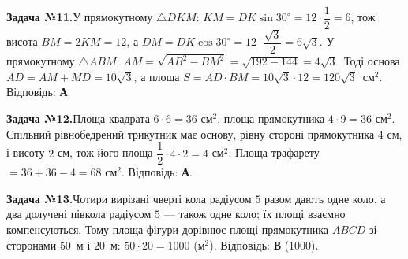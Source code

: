 \documentclass[12pt]{article}
\begin{document}
\par\vspace{0.3cm}\noindent\hypertarget{sol:11}{}
\begin{tcolorbox}[colback=titleBg!40, colframe=mainGreen!55, boxrule=0.4pt, arc=2pt, left=6pt, right=6pt, top=4pt, bottom=4pt, breakable]
\noindent\small\textbf{Задача №11.}\quad У прямокутному $\triangle DKM$: $KM=DK\sin30^\circ=12\cdot\dfrac{1}{2}=6$, тож висота $BM=2KM=12$, а $DM=DK\cos30^\circ=12\cdot\dfrac{\sqrt3}{2}=6\sqrt3$. У прямокутному $\triangle ABM$: $AM=\sqrt{AB^2-BM^2}=\sqrt{192-144}=4\sqrt3$. Тоді основа $AD=AM+MD=10\sqrt3$, а площа $S=AD\cdot BM=10\sqrt3\cdot12=120\sqrt3$~см$^2$. Відповідь: \textbf{А}.
\par\vspace{0.1cm}\hfill\hyperlink{task:11}{}
\end{tcolorbox}
\par\vspace{0.3cm}\noindent\hypertarget{sol:12}{}
\begin{tcolorbox}[colback=titleBg!40, colframe=mainGreen!55, boxrule=0.4pt, arc=2pt, left=6pt, right=6pt, top=4pt, bottom=4pt, breakable]
\noindent\small\textbf{Задача №12.}\quad Площа квадрата $6\cdot 6=36$ см$^2$, площа прямокутника $4\cdot 9=36$ см$^2$. Спільний рівнобедрений трикутник має основу, рівну стороні прямокутника $4$ см, і висоту $2$ см, тож його площа $\dfrac{1}{2}\cdot 4\cdot 2=4$ см$^2$. Площа трафарету $=36+36-4=68$ см$^2$. Відповідь: \textbf{А}.
\par\vspace{0.1cm}\hfill\hyperlink{task:12}{}
\end{tcolorbox}
\par\vspace{0.3cm}\noindent\hypertarget{sol:13}{}
\begin{tcolorbox}[colback=titleBg!40, colframe=mainGreen!55, boxrule=0.4pt, arc=2pt, left=6pt, right=6pt, top=4pt, bottom=4pt, breakable]
\noindent\small\textbf{Задача №13.}\quad Чотири вирізані чверті кола радіусом $5$ разом дають одне коло, а два долучені півкола радіусом $5$ — також одне коло; їх площі взаємно компенсуються. Тому площа фігури дорівнює площі прямокутника $ABCD$ зі сторонами $50$~м і $20$~м: $50\cdot20=1000$ (м$^2$). Відповідь: \textbf{В} ($1000$).
\par\vspace{0.1cm}\hfill\hyperlink{task:13}{}
\end{tcolorbox}
\end{document}
